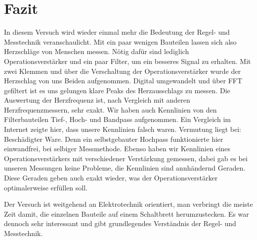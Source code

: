 \chapter{Fazit}

In diesem Versuch wird wieder einmal mehr die Bedeutung der Regel- und Messtechnik veranschaulicht. 
Mit ein paar wenigen Bauteilen lassen sich also Herzschläge von Menschen messen. 
Nötig dafür sind lediglich Operationsverstärker und ein paar Filter, um ein besseres Signal zu erhalten. 
Mit zwei Klemmen und über die Verschaltung der Operationsverstärker wurde der Herzschlag von uns Beiden aufgenommen.
Digital umgewandelt und über FFT gefiltert ist es uns gelungen klare Peaks des Herzausschlags zu messen.
Die Auswertung der Herzfrequenz ist, nach Vergleich mit anderen Herzfrequenzmessern, sehr exakt.
Wir haben auch Kennlinien von den Filterbauteilen Tief-, Hoch- und Bandpass aufgenommen.
Ein Vergleich im Internet zeigte hier, dass unsere Kennlinien falsch waren. Vermutung liegt bei: Beschädigter Ware.
Denn ein selbstgebauter Hochpass funktionierte hier einwandfrei, bei selbiger Messmethode.
Ebenso haben wir Kennlinien eines Operationsverstärkers mit verschiedener Verstärkung gemessen, dabei gab es bei unseren Messungen keine Probleme, die Kennlinien sind annhändernd Geraden. 
Diese Geraden geben auch exakt wieder, was der Operationsverstärker optimalerweise erfüllen soll.

Der Versuch ist weitgehend an Elektrotechnik orientiert, man verbringt die meiste Zeit damit,
die einzelnen Bauteile auf einem Schaltbrett herumzustecken. 
Es war dennoch sehr interessant und gibt grundlegendes Verständnis der Regel- und Messtechnik.\\
